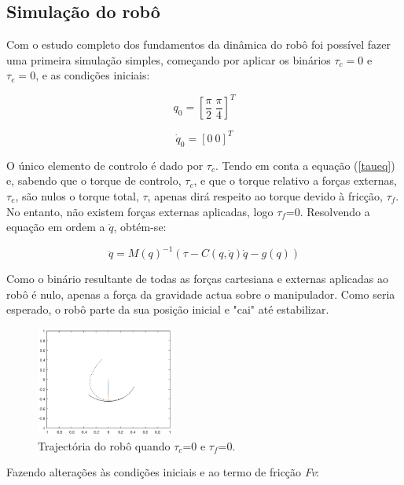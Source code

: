 \documentclass[a4paper,twocolumn,final,11pt]{article}
\let\oldref\ref
\renewcommand{\ref}[1]{(\oldref{#1})}
\begin{document}
 
\subsection{Simulação do robô}

Com o estudo completo dos fundamentos da dinâmica do robô foi possível fazer uma primeira simulação simples, começando por aplicar os binários $\tau_c = 0$ e $\tau_e= 0$, e as condições iniciais:

\begin{equation}
    q_0=\left[\frac{\pi}{2}~\frac{\pi}{4}\right]^T
\end{equation}

\begin{equation}
    \dot{q}_0=\left[0~0\right]^T
\end{equation}

O único elemento de controlo é dado por $\tau_c$.
Tendo em conta a equação \ref{taueq} e, sabendo que o torque de controlo, $\tau_c$, e que o torque  relativo a forças externas, $\tau_e$, são nulos o torque total, $\tau$, apenas dirá respeito ao torque devido à fricção, $\tau_f$. No entanto, não existem forças externas aplicadas, logo $\tau_f$=0.
Resolvendo a equação em ordem a $\ddot{q}$, obtém-se:

\begin{equation}
   \ddot{q} = M(q)^{-1} (\tau - C(q,\dot{q}) \dot{q} - g(q)) 
   \label{segDeriq}
\end{equation}

Como o binário resultante de todas as forças cartesiana e externas aplicadas ao robô é nulo, apenas a força da gravidade actua sobre o manipulador. Como seria esperado, o robô parte da sua posição inicial e "cai" até estabilizar. 

\begin{figure}[H]
	\centering
	\includegraphics[width=0.4\textwidth]{4.eps}
	\caption{Trajectória do robô quando $\tau_c$=0 e $\tau_f$=0.}
  \label{fig3}
\end{figure}

Fazendo alterações às condições iniciais e ao termo de fricção \textit{Fv}:
\\
\end{document}
